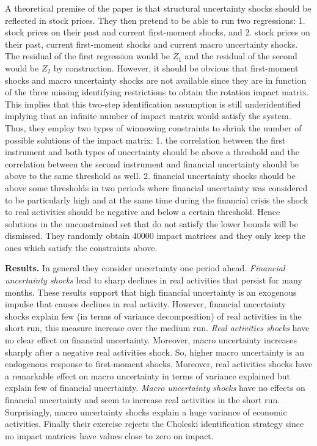 \documentclass{article}
\begin{document}
{A theoretical premise of the paper is that structural uncertainty shocks should be reflected in stock prices. They then pretend to be able to run two regressions: 1. stock prices on their past and current first-moment shocks, and 2. stock prices on their past, current first-moment shocks and current macro uncertainty shocks. The residual of the first regression would be $Z_1$ and the residual of the second would be $Z_2$ by construction. However, it should be obvious that first-moment shocks and macro uncertainty shocks are not available since they are in function of the three missing identifying restrictions to obtain the rotation impact matrix. This implies that this two-step identification assumption is still underidentified implying that an infinite number of impact matrix would satisfy the system. Thus, they employ two types of winnowing constraints to shrink the number of possible solutions of the impact matrix: 1. the correlation between the first instrument and both types of uncertainty should be above a threshold and the correlation between the second instrument and financial uncertainty should be above to the same threshold as well. 2. financial uncertainty shocks should be above some thresholds in two periods where financial uncertainty was considered to be particularly high and at the same time during the financial crisis the shock to real activities should be negative and below a certain threshold. Hence solutions in the unconstrained set that do not satisfy the lower bounds will be dismissed. They randomly obtain 40000 impact matrices and they only keep the ones which satisfy the constraints above.

\textbf{Results.} In general they consider uncertainty one period ahead. \textit{Financial uncertainty shocks} lead to sharp declines in real activities that persist for many months. These results support that high financial uncertainty is an exogenous impulse that causes declines in real activity. However, financial uncertainty shocks explain few (in terms of variance decomposition) of real activities in the short run, this measure increase over the medium run. \textit{Real activities shocks} have no clear effect on financial uncertainty. Moreover, macro uncertainty increases sharply after a negative real activities shock. So, higher macro uncertainty is an endogenous response to first-moment shocks. Moreover, real activities shocks have a remarkable effect on macro uncertainty in terms of variance explained but explain few of financial uncertainty. \textit{Macro uncertainty shocks} have no effects on financial uncertainty and seem to increase real activities in the short run. Surprisingly, macro uncertainty shocks explain a huge variance of economic activities. Finally their exercise rejects the Choleski identification strategy since no impact matrices have values close to zero on impact.


}
\end{document}
